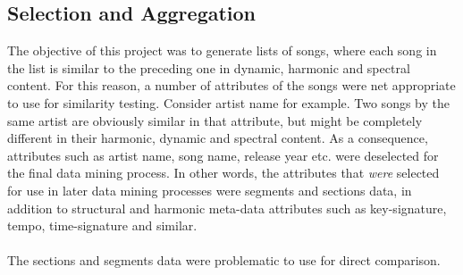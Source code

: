 \subsection{Selection and Aggregation}
\label{sec:preprocessing_selection}
The objective of this project was to generate lists of songs, where each song in the list is similar to the preceding one in dynamic, harmonic and spectral content. For this reason, a number of attributes of the songs were net appropriate to use for similarity testing. Consider artist name for example. Two songs by the same artist are obviously similar in that attribute, but might be completely different in their harmonic, dynamic and spectral content. As a consequence, attributes such as artist name, song name, release year etc. were deselected for the final data mining process. In other words, the attributes that \textit{were} selected for use in later data mining processes were segments and sections data, in addition to structural and harmonic meta-data attributes such as key-signature, tempo, time-signature and similar.
\\\\
The sections and segments data were problematic to use for direct comparison.

